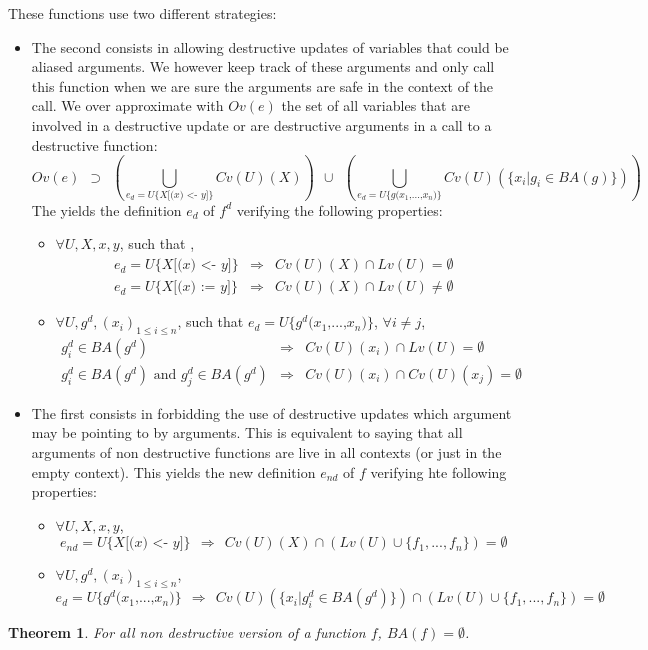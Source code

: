 \documentclass[12pt,a4paper]{article}
\newcommand{\cl}[1]{\texttt{#1}}
\newtheorem{theorem}{Theorem}
\newcommand{\ucont}[1]{\{#1\}}
\begin{document}
These functions use two different strategies:
\begin{itemize}
\item The second consists in allowing destructive updates of variables that could be aliased arguments. We however keep track of these arguments and only call this function when we are sure the arguments are safe in the context of the call. We over approximate with $Ov(e)$ the set of all variables that are involved in a destructive update or are destructive arguments in a call to a destructive function:
$$ Ov(e) \ \ \supset \ \ \left( \bigcup_{e_d = U\ucont{X\cl{[(}x \cl{) <- } y \cl{]} }}  Cv(U)(X) \right) \ \ \cup \ \ \left( \bigcup_{e_d = U\ucont{g\cl{(} x_1\cl{,} ... \cl{,} x_n \cl{)}}} Cv(U)( \{ x_i | g_i \in BA(g) \}) \right)$$
The yields the definition $e_d$ of $f^d$ verifying the following properties:
\begin{itemize}
\item $\forall U, X, x, y$, such that ,
\begin{eqnarray*}
e_d = U\ucont{X\cl{[(}x \cl{) <- } y \cl{]}} & \Longrightarrow & Cv(U)(X) \cap Lv(U) = \emptyset \\
e_d = U\ucont{X\cl{[(}x \cl{) := } y \cl{]}} & \Longrightarrow & Cv(U)(X) \cap Lv(U) \neq \emptyset
\end{eqnarray*}
\item $\forall U, g^d, (x_i)_{1 \leq i \leq n}$, such that $e_d = U\ucont{g^d\cl{(}x_1 \cl{,} ... \cl{,} x_n \cl{)}}$, $\forall i \neq j$,
\begin{eqnarray*}
g^d_i \in BA(g^d) & \Longrightarrow & Cv(U)(x_i) \cap Lv(U) = \emptyset \\
g^d_i \in BA(g^d) \text{ and } g^d_j \in BA(g^d) & \Longrightarrow & Cv(U)(x_i) \cap Cv(U)(x_j) = \emptyset
\end{eqnarray*}
\end{itemize}
\item The first consists in forbidding the use of destructive updates which argument may be pointing to by arguments. This is equivalent to saying that all arguments of non destructive functions are live in all contexts (or just in the empty context).
This yields the new definition $e_{nd}$ of $f$ verifying hte following properties:
\begin{itemize}
\item $\forall U, X, x, y$,
$$ e_{nd} = U\ucont{X\cl{[(}x \cl{) <- } y \cl{]}} \ \ \Longrightarrow \ \  Cv(U)(X) \cap \left( Lv(U) \cup \{f_1, ... , f_n \} \right) = \emptyset $$
\item $\forall U, g^d, (x_i)_{1 \leq i \leq n}$,
$$ e_d = U\ucont{g^d\cl{(}x_1 \cl{,} ... \cl{,} x_n \cl{)}} \ \ \Longrightarrow \ \  Cv(U)( \{ x_i | g^d_i \in BA(g^d) \}) \cap \left( Lv(U) \cup \{f_1, ... , f_n \} \right) = \emptyset $$
\end{itemize}
\end{itemize}
\begin{theorem}
For all non destructive version of a function $f$, $ BA(f) = \emptyset$.
\end{theorem}
\end{document}
